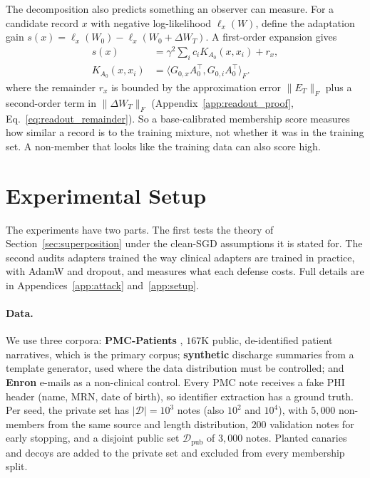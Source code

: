 \documentclass[11pt]{article}
\newcommand{\D}{\mathcal{D}}
\theoremstyle{plain}
\theoremstyle{definition}
\begin{document}
The decomposition also predicts something an observer can measure.
For a candidate record $x$ with negative log-likelihood $\ell_x(W)$, define the adaptation gain $s(x)=\ell_x(W_0)-\ell_x(W_0+\Delta W_T)$.
A first-order expansion gives
\begin{equation}
\begin{aligned}
s(x)&=\gamma^2\sum_i c_iK_{A_0}(x,x_i)+r_x,\\
K_{A_0}(x,x_i)&=\langle G_{0,x}A_0^\top,G_{0,i}A_0^\top\rangle_F.
\end{aligned}
\label{eq:kernel_readout}
\end{equation}
where the remainder $r_x$ is bounded by the approximation error $\|E_T\|_F$ plus a second-order term in $\|\Delta W_T\|_F$ (Appendix~\ref{app:readout_proof}, Eq.~\eqref{eq:readout_remainder}).
So a base-calibrated membership score \citep{carlini2022membership,duan2024membership,ran2025loraleak} measures how similar a record is to the training mixture, not whether it was in the training set. A non-member that looks like the training data can also score high.

\section{Experimental Setup}\label{sec:setup}

The experiments have two parts.
The first tests the theory of Section~\ref{sec:superposition} under the clean-SGD assumptions it is stated for.
The second audits adapters trained the way clinical adapters are trained in practice, with AdamW and dropout, and measures what each defense costs.
Full details are in Appendices~\ref{app:attack} and~\ref{app:setup}.

\paragraph{Data.}
We use three corpora: \textbf{PMC-Patients} \citep{zhao2023pmcpatients}, $167$K public, de-identified patient narratives, which is the primary corpus; \textbf{synthetic} discharge summaries from a template generator, used where the data distribution must be controlled; and \textbf{Enron} e-mails \citep{klimt2004enron} as a non-clinical control.
Every PMC note receives a fake PHI header (name, MRN, date of birth), so identifier extraction has a ground truth.
Per seed, the private set has $|\D|{=}10^3$ notes (also $10^2$ and $10^4$), with $5{,}000$ non-members from the same source and length distribution, $200$ validation notes for early stopping, and a disjoint public set $\D_{\text{pub}}$ of $3{,}000$ notes.
Planted canaries and decoys are added to the private set and excluded from every membership split.
\end{document}
